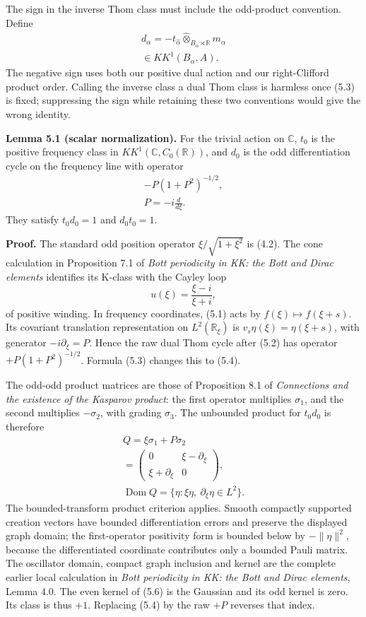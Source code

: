 \documentclass[
  11pt,
]{article}
\begin{document}
The sign in the inverse Thom class must include the odd-product
convention. Define \[
\begin{gathered}
d_\alpha=-t_{\widehat\alpha}
 \widehat\otimes_{B_\alpha\rtimes\mathbb R}m_\alpha\\
 \in KK^1(B_\alpha,A).
\end{gathered}
\tag{5.3}
\] The negative sign uses both our positive dual action and our
right-Clifford product order. Calling the inverse class a dual Thom
class is harmless once (5.3) is fixed; suppressing the sign while
retaining these two conventions would give the wrong identity.

\textbf{Lemma 5.1 (scalar normalization).} For the trivial action on
\(\mathbb C\), \(t_0\) is the positive frequency class in
\(KK^1(\mathbb C,C_0(\mathbb R))\), and \(d_0\) is the odd
differentiation cycle on the frequency line with operator \[
\begin{gathered}
-P(1+P^2)^{-1/2},\\
P=-i\frac{d}{d\xi}.
\end{gathered}
\tag{5.4}
\] They satisfy \(t_0d_0=1\) and \(d_0t_0=1\).

\textbf{Proof.} The standard odd position operator
\(\xi/\sqrt{1+\xi^2}\) is (4.2). The cone calculation in Proposition 7.1
of \emph{Bott periodicity in KK: the Bott and Dirac elements} identifies
its K-class with the Cayley loop \[
u(\xi)=\frac{\xi-i}{\xi+i},
\tag{5.5}
\] of positive winding. In frequency coordinates, (5.1) acts by
\(f(\xi)\mapsto f(\xi+s)\). Its covariant translation representation on
\(L^2(\mathbb R_\xi)\) is \(v_s\eta(\xi)=\eta(\xi+s)\), with generator
\(-i\partial_\xi=P\). Hence the raw dual Thom cycle after (5.2) has
operator \(+P(1+P^2)^{-1/2}\). Formula (5.3) changes this to (5.4).

The odd-odd product matrices are those of Proposition 8.1 of
\emph{Connections and the existence of the Kasparov product}: the first
operator multiplies \(\sigma_1\), and the second multiplies
\(-\sigma_2\), with grading \(\sigma_3\). The unbounded product for
\(t_0d_0\) is therefore \[
\begin{gathered}
Q=\xi\sigma_1+P\sigma_2\\
 =\begin{pmatrix}0&\xi-\partial_\xi\\
                  \xi+\partial_\xi&0\end{pmatrix},\\
\operatorname{Dom}Q
 =\{\eta:\xi\eta,\ \partial_\xi\eta\in L^2\}.
\end{gathered}
\tag{5.6}
\] The bounded-transform product criterion applies. Smooth compactly
supported creation vectors have bounded differentiation errors and
preserve the displayed graph domain; the first-operator positivity form
is bounded below by \(-\|\eta\|^2\), because the differentiated
coordinate contributes only a bounded Pauli matrix. The oscillator
domain, compact graph inclusion and kernel are the complete earlier
local calculation in \emph{Bott periodicity in KK: the Bott and Dirac
elements}, Lemma 4.0. The even kernel of (5.6) is the Gaussian and its
odd kernel is zero. Its class is thus \(+1\). Replacing (5.4) by the raw
\(+P\) reverses that index.
\end{document}
